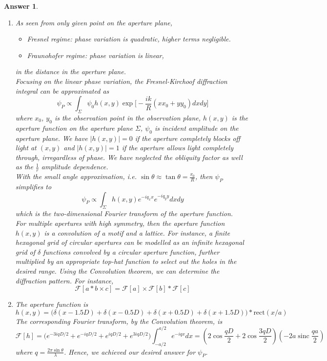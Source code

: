 \documentclass[a4paper]{article}
\DeclareMathOperator{\sinc}{sinc}
\newtheorem{ans}{Answer}[subsection]
\theoremstyle{new}
\begin{document}
\newpage
\begin{ans}\leavevmode
\begin{enumerate}[label=(\alph*)]
\item As seen from only given point on the aperture plane,
\begin{itemize}
    \item Fresnel regime: phase variation is quadratic, higher terms negligible.
    \item Fraunohofer regime: phase variation is linear,
\end{itemize}
in the distance in the aperture plane.\\[5pt]
Focusing on the linear phase variation, the Fresnel-Kirchoof diffraction integral can be approximated as
$$\psi_P\propto\int_\Sigma\psi_0h(x,y)\exp\bigg[-\frac{ik}{R}(xx_0+yy_0)dxdy\bigg]$$
where $x_0$, $y_0$ is the observation point in the observation plane, $h(x,y)$ is the aperture function on the aperture plane $\Sigma$, $\psi_0$ is incident amplitude on the aperture plane. We have $|h(x,y)|=0$ if the aperture completely blocks off light at $(x,y)$ and $|h(x,y)|=1$ if the aperture allows light completely through, irregardless of phase. We have neglected the obliquity factor as well as the $\frac{1}{r}$ amplitude dependence.\\[5pt]
With the small angle approximation, i.e. $\sin\theta\approx\tan\theta=\frac{x_0}{R}$, then $\psi_P$ simplifies to
$$\psi_P\propto\int_\Sigma h(x,y)e^{-iq_xx}e^{-iq_yy}dxdy$$
which is the two-dimensional Fourier transform of the aperture function.\\[5pt]
For multiple apertures with high symmetry, then the aperture function $h(x,y)$ is a convolution of a motif and a lattice. For instance, a finite hexagonal grid of circular apertures can be modelled as an infinite hexagonal grid of $\delta$ functions convolved by a circular aperture function, further multiplied by an appropriate top-hat function to select out the holes in the desired range. Using the Convolution theorem, we can determine the diffraction pattern. For instance,
$$\mathcal{F}[a*b\times c]=\mathcal{F}[a]\times\mathcal{F}[b]*\mathcal{F}[c]$$
\item The aperture function is
$$h(x,y)=\bigg(\delta(x-1.5D)+\delta(x-0.5D)+\delta(x+0.5D)+\delta(x+1.5D)\bigg)*\text{rect}(x/a)$$
The corresponding Fourier transform, by the Convolution theorem, is
$$\mathcal{F}[h]=\bigg(e^{-3iqD/2}+e^{-iqD/2}+e^{iqD/2}+e^{3iqD/2}\bigg)\int_{-a/2}^{a/2}e^{-iqx}dx=(2\cos\frac{qD}{2}+2\cos\frac{3qD}{2})(-2a\sinc\frac{qa}{2})$$
where $q=\frac{2\pi\sin\theta}{\lambda}$. Hence, we achieved our desired answer for $\psi_P$.

\end{enumerate}
\end{ans}
\end{document}
